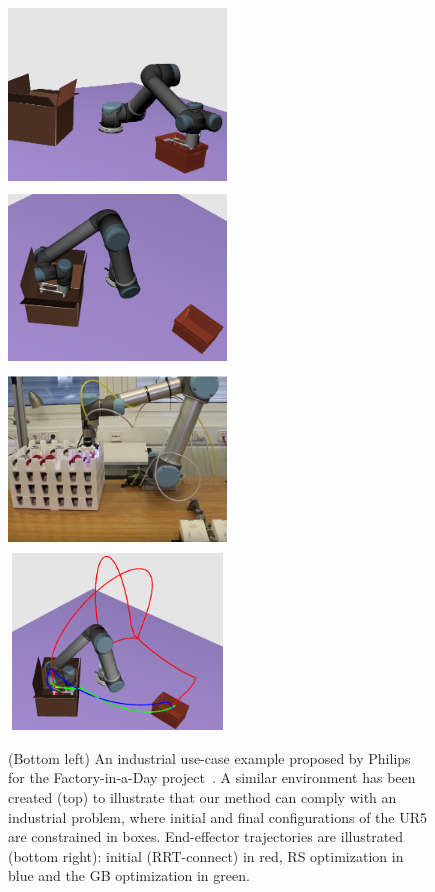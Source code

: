 \documentclass{tADR2e}
\begin{document}
\begin{figure}
	\centering
	\includegraphics[width=5.8cm,height=4.7cm]{fiad_qinit.png}
	\includegraphics[width=5.8cm,height=4.7cm]{fiad_qfinal.png}\\
	\includegraphics[width=5.8cm,height=4.7cm]{fiad_real.png}
	\includegraphics[width=5.8cm,height=4.7cm]{fiad-trajectorires.png}
	\caption{(Bottom left) An industrial use-case example proposed by Philips for 	
	the Factory-in-a-Day project~\cite{factory-day-video}. A similar environment 	
	has been created (top) to illustrate that our method can comply with an 
	industrial problem, where initial and final configurations of the UR5 are 
	constrained in boxes. End-effector trajectories 
	are illustrated (bottom right): initial (RRT-connect) in red, RS 
	optimization in blue and the GB optimization in green.}
	\label{fiad}
\end{figure}
\end{document}
